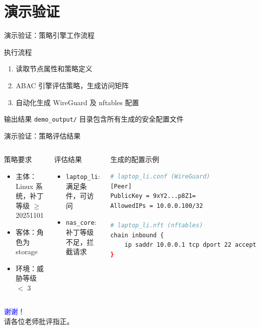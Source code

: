 \documentclass[aspectratio=169, 10pt]{beamer}
\begin{document}
\section{演示验证}
\begin{frame}{演示验证：策略引擎工作流程}
\begin{block}{执行流程}
\begin{enumerate}
    \item 读取节点属性和策略定义
    \item ABAC 引擎评估策略，生成访问矩阵
    \item 自动化生成 WireGuard 及 nftables 配置
\end{enumerate}
\end{block}
\begin{block}{输出结果}
\texttt{demo\_output/} 目录包含所有生成的安全配置文件
\end{block}
\end{frame}

\begin{frame}[fragile]{演示验证：策略评估结果}
\begin{columns}
\begin{block}{策略要求}
\tiny
\begin{itemize}
    \item 主体：Linux 系统，补丁等级 $\geq$ 20251101
    \item 客体：角色为 storage
    \item 环境：威胁等级 $<$ 3
\end{itemize}
\end{block}
\begin{block}{评估结果}
\tiny
\begin{itemize}
    \item \texttt{laptop\_li}: 满足条件，可访问
    \item \texttt{nas\_core}: 补丁等级不足，拦截请求
\end{itemize}
\end{block}
\begin{block}{生成的配置示例}
\begin{lstlisting}[language=bash]
# laptop_li.conf (WireGuard)
[Peer]
PublicKey = 9xY2...p8Z1=
AllowedIPs = 10.0.0.100/32

# laptop_li.nft (nftables)
chain inbound {
    ip saddr 10.0.0.1 tcp dport 22 accept
}
\end{lstlisting}
\end{block}
\end{columns}
\end{frame}

\begin{frame}
\centering
\Huge \textcolor{blue}{谢谢！} \\
\vspace{20pt}
\large 请各位老师批评指正。
\end{frame}
\end{document}
